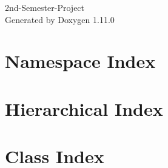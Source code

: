 \documentclass[twoside]{book}
\newcommand{\+}{\discretionary{\mbox{\scriptsize$\hookleftarrow$}}{}{}}
\newcommand{\clearemptydoublepage}{%
    \newpage{\pagestyle{empty}\cleardoublepage}%
  }
\begin{document}
  \raggedbottom
  \begin{titlepage}
  \vspace*{7cm}
  \begin{center}%
  {\Large 2nd-\/\+Semester-\/\+Project}\\
  \vspace*{1cm}
  {\large Generated by Doxygen 1.11.0}\\
  \end{center}
  \end{titlepage}
  \clearemptydoublepage
  \tableofcontents
  \clearemptydoublepage





\chapter{Namespace Index}

\chapter{Hierarchical Index}

\chapter{Class Index}

\end{document}
